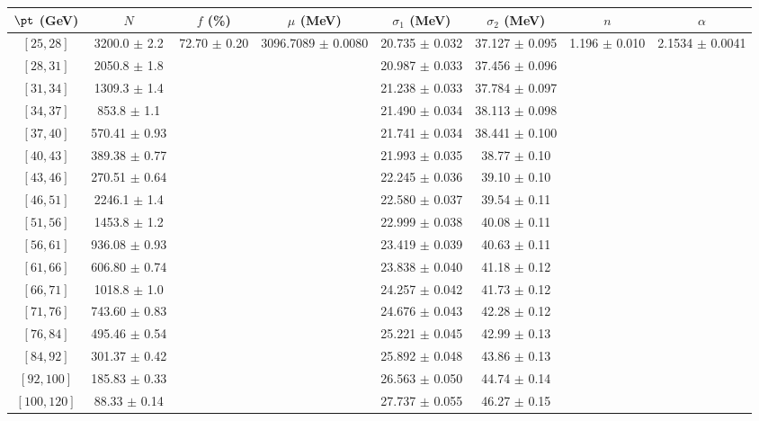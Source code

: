 \begin{tabular}{c||c|c|c|c|c|c|c}
$\pt$ (GeV) & $N$ & $f$ (\%) & $\mu$ (MeV) & $\sigma_1$ (MeV) & $\sigma_2$ (MeV) & $n$ & $\alpha$ \\
\hline
$[25, 28]$ & 3200.0 $\pm$ 2.2 & \multirow{17}{*}{72.70 $\pm$ 0.20} & \multirow{17}{*}{3096.7089 $\pm$ 0.0080} & 20.735 $\pm$ 0.032 & 37.127 $\pm$ 0.095 & \multirow{17}{*}{1.196 $\pm$ 0.010} & \multirow{17}{*}{2.1534 $\pm$ 0.0041}\\
$[28, 31]$ & 2050.8 $\pm$ 1.8 &  &  & 20.987 $\pm$ 0.033 & 37.456 $\pm$ 0.096 &  & \\
$[31, 34]$ & 1309.3 $\pm$ 1.4 &  &  & 21.238 $\pm$ 0.033 & 37.784 $\pm$ 0.097 &  & \\
$[34, 37]$ & 853.8 $\pm$ 1.1 &  &  & 21.490 $\pm$ 0.034 & 38.113 $\pm$ 0.098 &  & \\
$[37, 40]$ & 570.41 $\pm$ 0.93 &  &  & 21.741 $\pm$ 0.034 & 38.441 $\pm$ 0.100 &  & \\
$[40, 43]$ & 389.38 $\pm$ 0.77 &  &  & 21.993 $\pm$ 0.035 & 38.77 $\pm$ 0.10 &  & \\
$[43, 46]$ & 270.51 $\pm$ 0.64 &  &  & 22.245 $\pm$ 0.036 & 39.10 $\pm$ 0.10 &  & \\
$[46, 51]$ & 2246.1 $\pm$ 1.4 &  &  & 22.580 $\pm$ 0.037 & 39.54 $\pm$ 0.11 &  & \\
$[51, 56]$ & 1453.8 $\pm$ 1.2 &  &  & 22.999 $\pm$ 0.038 & 40.08 $\pm$ 0.11 &  & \\
$[56, 61]$ & 936.08 $\pm$ 0.93 &  &  & 23.419 $\pm$ 0.039 & 40.63 $\pm$ 0.11 &  & \\
$[61, 66]$ & 606.80 $\pm$ 0.74 &  &  & 23.838 $\pm$ 0.040 & 41.18 $\pm$ 0.12 &  & \\
$[66, 71]$ & 1018.8 $\pm$ 1.0 &  &  & 24.257 $\pm$ 0.042 & 41.73 $\pm$ 0.12 &  & \\
$[71, 76]$ & 743.60 $\pm$ 0.83 &  &  & 24.676 $\pm$ 0.043 & 42.28 $\pm$ 0.12 &  & \\
$[76, 84]$ & 495.46 $\pm$ 0.54 &  &  & 25.221 $\pm$ 0.045 & 42.99 $\pm$ 0.13 &  & \\
$[84, 92]$ & 301.37 $\pm$ 0.42 &  &  & 25.892 $\pm$ 0.048 & 43.86 $\pm$ 0.13 &  & \\
$[92, 100]$ & 185.83 $\pm$ 0.33 &  &  & 26.563 $\pm$ 0.050 & 44.74 $\pm$ 0.14 &  & \\
$[100, 120]$ & 88.33 $\pm$ 0.14 &  &  & 27.737 $\pm$ 0.055 & 46.27 $\pm$ 0.15 &  & \\
\end{tabular}
